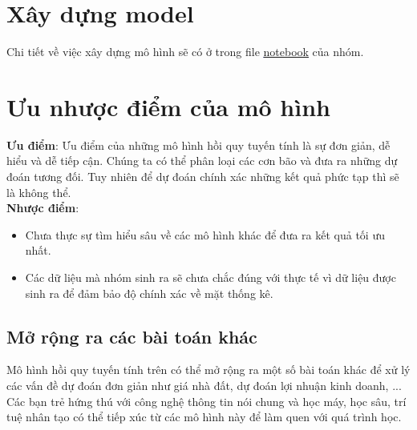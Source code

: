 \documentclass[12pt]{report}
\begin{document}
\section{Xây dựng model} %
\label{sec:xây_dựng_model}
\begin{flushleft}
	Chi tiết về việc xây dựng mô hình sẽ có ở trong file \textcolor{blue}{\underline{\href{https://github.com/XuananLe/MathModelingContest/blob/main/main.ipynb}{notebook}}} của nhóm.
\end{flushleft}

\section{Ưu nhược điểm của mô hình} %
\label{sec:ưu_nhược_điểm_của_mô_hình}
\begin{flushleft}
	\textbf{Ưu điểm}: Ưu điểm của những mô hình hồi quy tuyến tính là sự đơn giản, dễ hiểu và dễ tiếp cận. Chúng ta có thể phân loại các cơn bão và đưa ra những dự đoán tương đối. Tuy nhiên để dự đoán chính xác những kết quả phức tạp thì sẽ là không thể.
	\\[\baselineskip]

	\textbf{Nhược điểm}:
	\begin{itemize}
		\item Chưa thực sự tìm hiểu sâu về các mô hình khác để đưa ra kết quả tối ưu nhất.

		\item Các dữ liệu mà nhóm sinh ra sẽ chưa chắc đúng với thực tế vì dữ liệu được sinh ra để đảm bảo độ chính xác về mặt thống kê.
	\end{itemize}
\end{flushleft}

\subsection{Mở rộng ra các bài toán khác} %
\label{ssub:mở_rộng_ra_các_bài_toán_khác}
\begin{flushleft}
	Mô hình hồi quy tuyến tính trên có thể mở rộng ra một số bài toán khác để xử lý các vấn đề dự đoán đơn giản như giá nhà đất, dự đoán lợi nhuận kinh doanh, ...
	\\[\baselineskip]

	Các bạn trẻ hứng thú với công nghệ thông tin nói chung và học máy, học sâu, trí tuệ nhân tạo có thể tiếp xúc từ các mô hình này để làm quen với quá trình học.
\end{flushleft}
\end{document}
